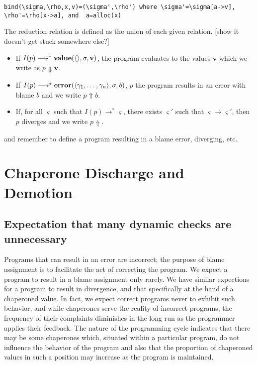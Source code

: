\documentclass{sigplanconf}
\begin{document}
\begin{verbatim}
bind(\sigma,\rho,x,v)=(\sigma',\rho') where \sigma'=\sigma[a->v], \rho'=\rho[x->a], and  a=alloc(x)
\end{verbatim}

The reduction relation is defined as the union of each given relation.
[show it doesn't get stuck somewhere else?]
\begin{itemize}
\item If $I(p)\longrightarrow^{*}\mathbf{value}(\langle\rangle,\sigma,\mathbf{v})$, the program evaluates to the values $\mathbf{v}$ which we write as $p\Downarrow\mathbf{v}$.
\item If $I(p)\longrightarrow^{*}\mathbf{error}(\langle\gamma_1,\dots,\gamma_n\rangle,\sigma,b)$, $p$ the program results in an error with blame $b$ and we write $p\Uparrow b$.
\item If, for all $\varsigma$ such that $I(p)\longrightarrow^{*}\varsigma$, there exists $\varsigma'$ such that $\varsigma\longrightarrow\varsigma'$, then $p$ diverges and we write $p\Uparrow$.
\end{itemize}


and remember to define a program resulting in a blame error, diverging, etc.

\section{Chaperone Discharge and Demotion}

\subsection{Expectation that many dynamic checks are unnecessary}

Programs that can result in an error are incorrect; the purpose of blame assignment is to facilitate the act of correcting the program.
We expect a program to result in a blame assignment only rarely.
We have similar expections for a program to result in divergence, and that specifically at the hand of a chaperoned value.
In fact, we expect correct programs never to exhibit such behavior, and while chaperones serve the reality of incorrect programs, the frequency of their complaints diminishes in the long run as the programmer applies their feedback.
The nature of the programming cycle indicates that there may be some chaperones which, situated within a particular program, do not influence the behavior of the program and also that the proportion of chaperoned values in such a position may increase as the program is maintained.
\end{document}
